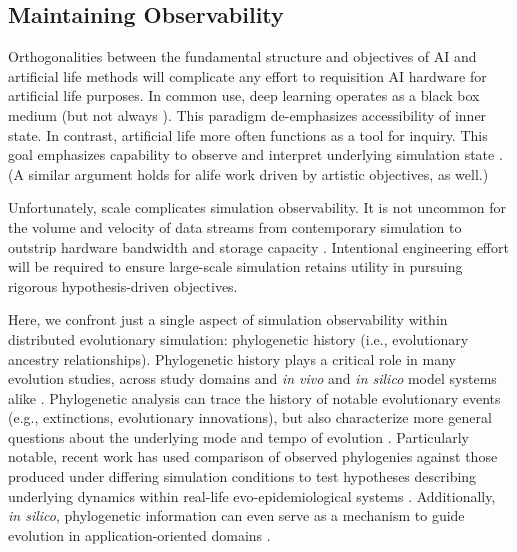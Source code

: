 \subsection{Maintaining Observability}

Orthogonalities between the fundamental structure and objectives of AI and artificial life methods will complicate any effort to requisition AI hardware for artificial life purposes.
In common use, deep learning operates as a black box medium \citep{loyola2019black} (but not always \citep{mahendran2015understanding}).
This paradigm de-emphasizes accessibility of inner state.
In contrast, artificial life more often functions as a tool for inquiry.
This goal emphasizes capability to observe and interpret underlying simulation state \citep{moreno2023toward,horgan1995complexity}.
(A similar argument holds for alife work driven by artistic objectives, as well.)

Unfortunately, scale complicates simulation observability.
It is not uncommon for the volume and velocity of data streams from contemporary simulation to outstrip hardware bandwidth and storage capacity \citep{osti_1770192}.
Intentional engineering effort will be required to ensure large-scale simulation retains utility in pursuing rigorous hypothesis-driven objectives.

Here, we confront just a single aspect of simulation observability within distributed evolutionary simulation: phylogenetic history (i.e., evolutionary ancestry relationships).
Phylogenetic history plays a critical role in many evolution studies, across study domains and \textit{in vivo} and \textit{in silico} model systems alike \citep{faithConservationEvaluationPhylogenetic1992,STAMATAKIS2005phylogenetics,frenchHostPhylogenyShapes2023,kim2006discovery,lewinsohnStatedependentEvolutionaryModels2023a,lenski2003evolutionary,moreno2021case}.
Phylogenetic analysis can trace the history of notable evolutionary events (e.g., extinctions, evolutionary innovations), but also characterize more general questions about the underlying mode and tempo of evolution \citep{moreno2023toward,hernandez2022can,shahbandegan2022untangling,lewinsohnStatedependentEvolutionaryModels2023a}.
Particularly notable, recent work has used comparison of observed phylogenies against those produced under differing simulation conditions to test hypotheses describing underlying dynamics within real-life evo-epidemiological systems \citep{giardina2017inference,voznica2022deep}.
Additionally, \textit{in silico}, phylogenetic information can even serve as a mechanism to guide evolution in application-oriented domains \citep{lalejini2024phylogeny,lalejini2024runtime,murphy2008simple,burke2003increased}.

